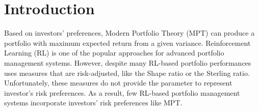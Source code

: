 \chapter{Introduction}

Based on investors' preferences, Modern Portfolio Theory (MPT) can produce a portfolio with maximum expected return from a given variance\cite{10.2307/2975974}. Reinforcement Learning (RL) is one of the popular approaches for advanced portfolio management systems.  However, despite many RL-based portfolio performances uses measures that are risk-adjusted\cite{cogneau2009101}, like the Shape ratio\cite{Sharpe49} or the Sterling ratio\cite{magdon2004maximum}. Unfortunately, these measures do not provide the parameter to represent investor's risk preferences. As a result,  few RL-based portfolio management systems incorporate investors' risk preferences like MPT. 



% 
% 


\label{c:intro}

